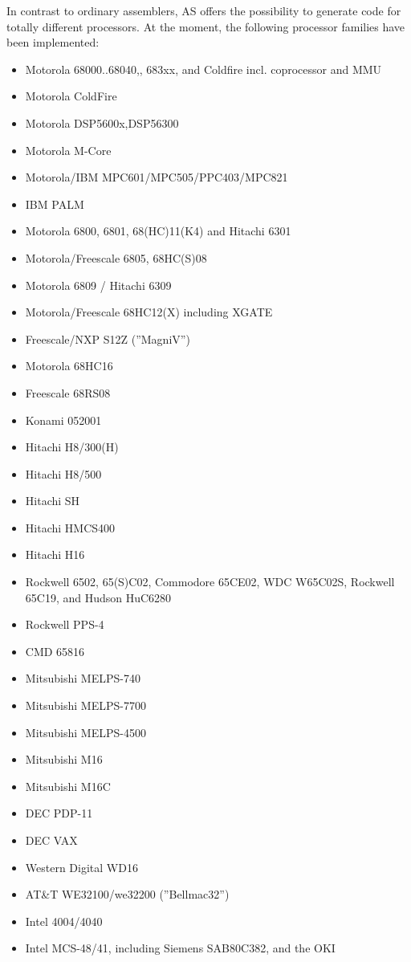 \documentclass[12pt,twoside]{report}
\newcommand{\asname}{{AS}}
\begin{document}
In contrast to ordinary assemblers, \asname{} offers the possibility to
generate code for totally different processors.  At the moment, the
following processor families have been implemented:
\begin{itemize}
\item{Motorola 68000..68040,, 683xx, and Coldfire incl. coprocessor and MMU}
\item{Motorola ColdFire}
\item{Motorola DSP5600x,DSP56300}\item{Motorola M-Core}
\item{Motorola/IBM MPC601/MPC505/PPC403/MPC821}
\item{IBM PALM}
\item{Motorola 6800, 6801, 68(HC)11(K4) and Hitachi 6301}
\item{Motorola/Freescale 6805, 68HC(S)08}
\item{Motorola 6809 / Hitachi 6309}
\item{Motorola/Freescale 68HC12(X) including XGATE}
\item{Freescale/NXP S12Z (''MagniV'')}
\item{Motorola 68HC16}
\item{Freescale 68RS08}
\item{Konami 052001}
\item{Hitachi H8/300(H)}
\item{Hitachi H8/500}
\item{Hitachi SH}
\item{Hitachi HMCS400}
\item{Hitachi H16}
\item{Rockwell 6502, 65(S)C02, Commodore 65CE02, WDC W65C02S, Rockwell 65C19, and
      Hudson HuC6280}
\item{Rockwell PPS-4}
\item{CMD 65816}
\item{Mitsubishi MELPS-740}
\item{Mitsubishi MELPS-7700}
\item{Mitsubishi MELPS-4500}
\item{Mitsubishi M16}
\item{Mitsubishi M16C}
\item{DEC PDP-11}
\item{DEC VAX}
\item{Western Digital WD16}
\item{AT\&T WE32100/we32200 (''Bellmac32'')}
\item{Intel 4004/4040}
\item{Intel MCS-48/41, including Siemens SAB80C382, and the OKI
}
\end{itemize}
\end{document}
